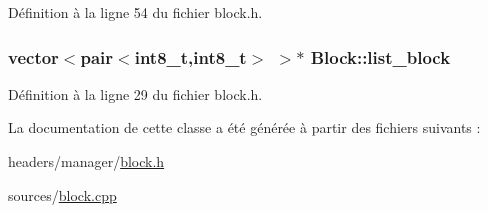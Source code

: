 Définition à la ligne 54 du fichier block.\-h.

\hypertarget{class_block_a45c3e71b45b9ef6364eac9354563aedd}{
\subsubsection[{list\-\_\-block}]{\setlength{\rightskip}{0pt plus 5cm}vector$<$pair$<$int8\-\_\-t,int8\-\_\-t$>$ $>$$\ast$ Block\-::list\-\_\-block}}\label{class_block_a45c3e71b45b9ef6364eac9354563aedd}


Définition à la ligne 29 du fichier block.\-h.



La documentation de cette classe a été générée à partir des fichiers suivants \-:\begin{DoxyCompactItemize}
\item 
headers/manager/\hyperlink{block_8h}{block.\-h}\item 
sources/\hyperlink{block_8cpp}{block.\-cpp}\end{DoxyCompactItemize}
